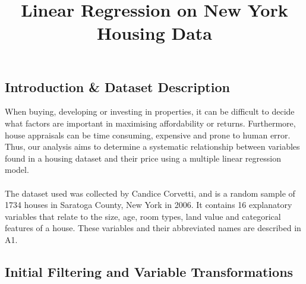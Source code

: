 \documentclass[letterpaper,9pt,twocolumn,twoside,]{pinp}
\title{Linear Regression on New York Housing Data}
\author[]{}
\begin{document}
\verticaladjustment{-2pt}

\maketitle
\thispagestyle{firststyle}



\hypertarget{introduction-dataset-description}{%
\subsection{Introduction \& Dataset
Description}\label{introduction-dataset-description}}

\hfill\break
\noindent When buying, developing or investing in properties, it can be
difficult to decide what factors are important in maximising
affordability or returns. Furthermore, house appraisals can be time
consuming, expensive and prone to human error. Thus, our analysis aims
to determine a systematic relationship between variables found in a
housing dataset and their price using a multiple linear regression
model.\\
~\\
\noindent The dataset used was collected by Candice Corvetti, and is a
random sample of 1734 houses in Saratoga County, New York in 2006. It
contains 16 explanatory variables that relate to the size, age, room
types, land value and categorical features of a house. These variables
and their abbreviated names are described in A1.\\

\vspace{-5pt}

\hypertarget{initial-filtering-and-variable-transformations}{%
\subsection{Initial Filtering and Variable
Transformations}\label{initial-filtering-and-variable-transformations}}
\end{document}
